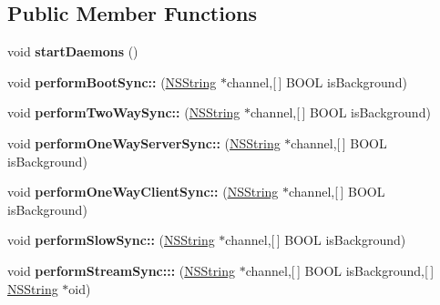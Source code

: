 \subsection*{\-Public \-Member \-Functions}
\begin{DoxyCompactItemize}
\item 
\hypertarget{interface_sync_service_a62662a7e0d0489b0e3da8ded6e9ed1dc}{
void {\bfseries start\-Daemons} ()}
\label{interface_sync_service_a62662a7e0d0489b0e3da8ded6e9ed1dc}

\item 
\hypertarget{interface_sync_service_aed9eb7063f95dad45602035e12c4c507}{
void {\bfseries perform\-Boot\-Sync\-::} (\hyperlink{class_n_s_string}{\-N\-S\-String} $\ast$channel,\mbox{[}$\,$\mbox{]} \-B\-O\-O\-L is\-Background)}
\label{interface_sync_service_aed9eb7063f95dad45602035e12c4c507}

\item 
\hypertarget{interface_sync_service_aa36781d8c95512e8d3739276ad519795}{
void {\bfseries perform\-Two\-Way\-Sync\-::} (\hyperlink{class_n_s_string}{\-N\-S\-String} $\ast$channel,\mbox{[}$\,$\mbox{]} \-B\-O\-O\-L is\-Background)}
\label{interface_sync_service_aa36781d8c95512e8d3739276ad519795}

\item 
\hypertarget{interface_sync_service_acc6039404459752f3b81b1e07adb72c8}{
void {\bfseries perform\-One\-Way\-Server\-Sync\-::} (\hyperlink{class_n_s_string}{\-N\-S\-String} $\ast$channel,\mbox{[}$\,$\mbox{]} \-B\-O\-O\-L is\-Background)}
\label{interface_sync_service_acc6039404459752f3b81b1e07adb72c8}

\item 
\hypertarget{interface_sync_service_a746882bfd7e306c87a4f9dc90cf1f43a}{
void {\bfseries perform\-One\-Way\-Client\-Sync\-::} (\hyperlink{class_n_s_string}{\-N\-S\-String} $\ast$channel,\mbox{[}$\,$\mbox{]} \-B\-O\-O\-L is\-Background)}
\label{interface_sync_service_a746882bfd7e306c87a4f9dc90cf1f43a}

\item 
\hypertarget{interface_sync_service_addd2e2179ad10b5286a53e7bc0b413c8}{
void {\bfseries perform\-Slow\-Sync\-::} (\hyperlink{class_n_s_string}{\-N\-S\-String} $\ast$channel,\mbox{[}$\,$\mbox{]} \-B\-O\-O\-L is\-Background)}
\label{interface_sync_service_addd2e2179ad10b5286a53e7bc0b413c8}

\item 
\hypertarget{interface_sync_service_ae3812ed2d5ecf3da914949ca38465380}{
void {\bfseries perform\-Stream\-Sync\-:::} (\hyperlink{class_n_s_string}{\-N\-S\-String} $\ast$channel,\mbox{[}$\,$\mbox{]} \-B\-O\-O\-L is\-Background,\mbox{[}$\,$\mbox{]} \hyperlink{class_n_s_string}{\-N\-S\-String} $\ast$oid)}
\label{interface_sync_service_ae3812ed2d5ecf3da914949ca38465380}


\end{DoxyCompactItemize}
